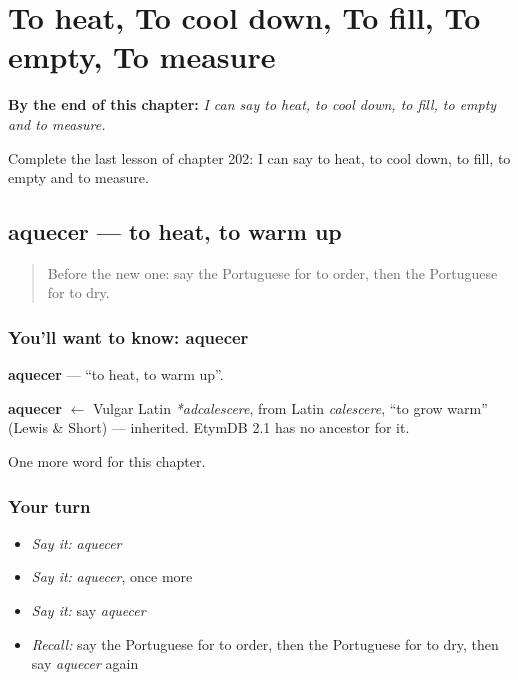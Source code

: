 
\chapter{To heat, To cool down, To fill, To empty, To measure}
\label{ch:pt-to-heat-to-cool-down-to-fill-to-empty-to-measure}

\begin{chapteropening}
\textbf{By the end of this chapter:} \emph{I can say to heat, to cool down, to fill, to empty and to measure.}

Complete the last lesson of chapter 202: I can say to heat, to cool down, to fill, to empty and to measure.
\end{chapteropening}

\section[aquecer]{aquecer — to heat, to warm up}

\label{lesson:PT-C202-aquecer}



\begin{quote}
Before the new one: say the Portuguese for to order, then the Portuguese for to dry.
\end{quote}

\subsection*{You'll want to know: aquecer}
\textbf{aquecer} — \textquotedblleft{}to heat, to warm up\textquotedblright{}.

\begin{cousinweb}
\textbf{aquecer} $\leftarrow$ Vulgar Latin \emph{*adcalescere}, from Latin \emph{calescere}, \textquotedblleft{}to grow warm\textquotedblright{} (Lewis \& Short) — inherited. EtymDB 2.1 has no ancestor for it.
\end{cousinweb}

\begin{grammarlens}[title={What you've built}]
One more word for this chapter.
\end{grammarlens}

\subsection*{Your turn}
\begin{itemize}
\raggedright
  \item \emph{Say it:} \emph{aquecer}
  \item \emph{Say it:} \emph{aquecer}, once more
  \item \emph{Say it:} say \emph{aquecer}
  \item \emph{Recall:} say the Portuguese for to order, then the Portuguese for to dry, then say \emph{aquecer} again
\end{itemize}

